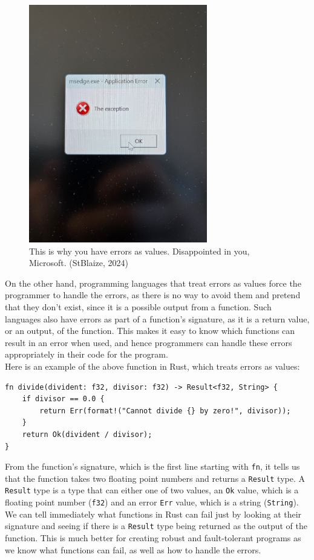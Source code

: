 \documentclass[11pt]{article}
\makeatletter
\newcommand{\citeprocitem}[2]{\hyper@linkstart{cite}{citeproc_bib_item_#1}#2\hyper@linkend}
\makeatother
\begin{document}
\begin{figure}[htbp]
\centering
\includegraphics[height=28em]{./images/microsoft-edge-exception.png}
\caption{This is why you have errors as values. Disappointed in you, Microsoft. (\citeprocitem{36}{StBlaize, 2024})}
\end{figure}

 \newpage

On the other hand, programming languages that
treat errors as values force the programmer
to handle the errors, as there is no way to
avoid them and pretend that they don't exist,
since it is a possible output from a function.
Such languages also have errors as part of a function's
signature, as it is a return value, or an output,
of the function. This makes it easy to know which
functions can result in an error when used,
and hence programmers can handle these errors
appropriately in their code for the program.  \\

Here is an example of the above function in Rust,
which treats errors as values:
\begin{verbatim}
fn divide(divident: f32, divisor: f32) -> Result<f32, String> {
    if divisor == 0.0 {
        return Err(format!("Cannot divide {} by zero!", divisor));
    }
    return Ok(divident / divisor);
}
\end{verbatim}

From the function's signature, which is the first line
starting with \texttt{fn}, it tells us that the function takes
two floating point numbers and returns a \texttt{Result} type.
A \texttt{Result} type is a type that can either one of two values,
an \texttt{Ok} value, which is a floating point number (\texttt{f32}) and an
error \texttt{Err} value, which is a string (\texttt{String}).
We can tell immediately what functions in Rust can fail
just by looking at their signature and seeing if there
is a \texttt{Result} type being returned as the output of the function.
This is much better for creating robust and fault-tolerant programs
as we know what functions can fail, as well as how to handle
the errors.  \\
\end{document}
